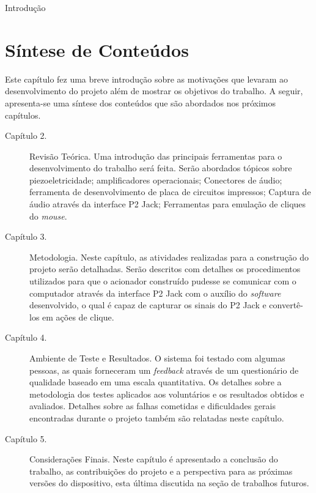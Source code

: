 \begin{chapter}{Introdução}
\section{Síntese de Conteúdos}

Este capítulo fez uma breve introdução sobre as motivações que levaram ao
desenvolvimento do projeto além de mostrar os objetivos do trabalho.
A seguir, apresenta-se uma síntese dos conteúdos que são abordados nos
próximos capítulos.

\begin{description}
	\item[Capítulo 2.] Revisão Teórica.
	Uma introdução das principais ferramentas para o desenvolvimento do trabalho
será feita. Serão abordados tópicos sobre piezoeletricidade; amplificadores
operacionais; Conectores de áudio; ferramenta de desenvolvimento de placa de
circuitos impressos; Captura de áudio através da interface P2 Jack; Ferramentas
para emulação de cliques do \textit{mouse}. 

	\item[Capítulo 3.] Metodologia. 
	Neste capítulo, as atividades realizadas para a construção do projeto serão
	detalhadas. Serão descritos com detalhes os procedimentos utilizados
	para que o acionador construído pudesse se comunicar com o computador
	através da interface P2 Jack com o auxílio do \textit{software} desenvolvido,
	o qual é capaz de capturar os sinais do P2 Jack e convertê-los em ações de
	clique.
	
	\item[Capítulo 4.] Ambiente de Teste e Resultados. 
	O sistema foi testado com algumas pessoas, as quais forneceram um
	\textit{feedback} através de um questionário de qualidade baseado em uma escala
	quantitativa.  Os detalhes sobre a metodologia dos testes aplicados aos voluntários e
	os resultados obtidos e avaliados. Detalhes sobre as falhas cometidas e
	dificuldades gerais encontradas durante o projeto também são relatadas neste
	capítulo.

	\item[Capítulo 5.] Considerações Finais. 
    Neste capítulo é apresentado a conclusão do trabalho, as contribuições do
	projeto e a perspectiva para as próximas versões do dispositivo, esta última 
	discutida na seção de trabalhos futuros. 

\end{description}

\end{chapter}
